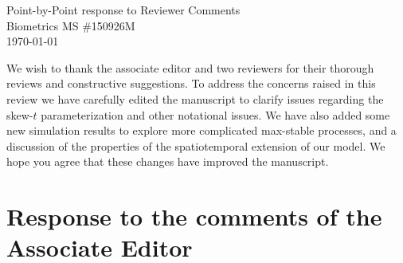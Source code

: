 \documentclass[11pt]{article}
\begin{document}
\begin{center}
Point-by-Point response to Reviewer Comments\\
Biometrics MS \#150926M\\
\today
\end{center}

We wish to thank the associate editor and two reviewers for their thorough reviews and constructive suggestions.
To address the concerns raised in this review we have carefully edited the manuscript to clarify issues regarding the skew-$t$ parameterization and other notational issues.
We have also added some new simulation results to explore more complicated max-stable processes, and a discussion of the properties of the spatiotemporal extension of our model.
We hope you agree that these changes have improved the manuscript.

\section*{Response to the comments of the Associate Editor}
\end{document}
